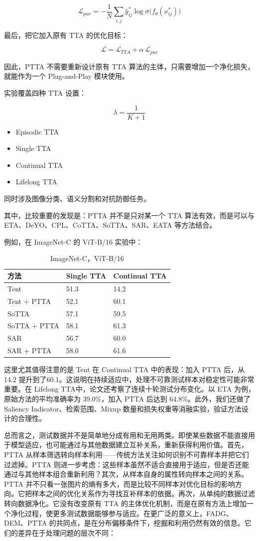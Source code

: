 \[
\mathcal{L}_{pur}=-\frac{1}{N}\sum_{i,j}\hat{y}^{*}_{ij}\log\sigma\bigl(f_\theta(x^{*}_{ij})\bigr)
\]

最后，把它加入原有 TTA 的优化目标：

\[
\mathcal{L}=\mathcal{L}_{TTA}+\alpha\,\mathcal{L}_{pur}
\]

因此，PTTA 不需要重新设计原有 TTA 算法的主体，只需要增加一个净化损失，就能作为一个 Plug-and-Play 模块使用。

实验覆盖四种 TTA 设置：

\[
\lambda=\frac{1}{K+1}
\]

\begin{itemize}
  \item Episodic TTA
  \item Single TTA
  \item Continual TTA
  \item Lifelong TTA
\end{itemize}

同时涉及图像分类、语义分割和对抗防御任务。

其中，比较重要的发现是：PTTA 并不是只对某一个 TTA 算法有效，而是可以与 ETA、DeYO、CPL、CoTTA、SoTTA、SAR、EATA 等方法结合。

例如，在 ImageNet-C 的 ViT-B/16 实验中：

\begin{table}[H]\centering
\caption*{ImageNet-C，ViT-B/16}
\begin{tabular}{lll}\toprule
\textbf{方法} & \textbf{Single TTA} & \textbf{Continual TTA} \\ \midrule
Tent & 51.3 & 14.2 \\
Tent + PTTA & 52.1 & 60.1 \\
SoTTA & 57.1 & 59.5 \\
SoTTA + PTTA & 58.1 & 61.3 \\
SAR & 56.7 & 60.0 \\
SAR + PTTA & 58.0 & 61.6 \\
\bottomrule\end{tabular}
\end{table}

这里尤其值得注意的是 Tent 在 Continual TTA 中的表现：加入 PTTA 后，从 14.2 提升到了60.1。这说明在持续适应中，处理不可靠测试样本对稳定性可能非常重要。在 Lifelong TTA中，论文还考察了连续十轮测试分布变化。以 ETA 为例，原始方法的平均准确率为 39.0\%，加入 PTTA 后达到 64.8\%。此外，我们还做了 Saliency Indicator、检索范围、Mixup 数量和损失权重等消融实验，验证方法设计的合理性。

总而言之，测试数据并不是简单地分成有用和无用两类。即使某些数据不能直接用于模型适应，也可能通过与其他数据建立互补关系，重新获得利用价值。首先，PTTA 从样本筛选转向样本利用——传统方法关注如何识别不可靠样本并把它们过滤掉。PTTA 则进一步考虑：这些样本虽然不适合直接用于适应，但是否还能通过与其他样本组合重新利用？其次，从样本自身的属性转向样本之间的关系。PTTA 并不只看一张图片的熵有多大，而是比较不同样本对优化目标的影响方向。它把样本之间的优化关系作为寻找互补样本的依据。再次，从单纯的数据过滤转向数据净化。它没有改变原有 TTA 的主体优化机制，而是在原有方法上增加一个净化过程，使更多测试数据能够参与适应。在更广泛的意义上，FADG、DEM、PTTA 的共同点，是在分布偏移条件下，挖掘和利用仍然有效的信息。它们的差异在于处理问题的层次不同：

